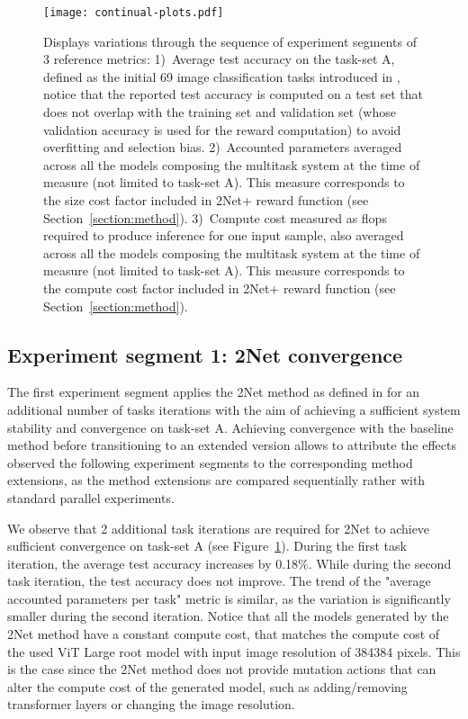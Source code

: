 \documentclass{article} \usepackage{iclr2023_conference,times}
\begin{document}
\begin{figure}[t]
  \centering
  \texttt{[image: continual-plots.pdf]}
  \caption{
  Displays variations through the sequence of experiment segments 
  of 3 reference metrics:
  1)~Average test accuracy on the task-set A, defined as the initial 69 image classification tasks introduced in \cite{Gesmundo2022munet2}, notice that the reported test accuracy is computed on a test set that does not overlap with the training set and validation set (whose validation accuracy is used for the reward computation) to avoid overfitting and selection bias.
  2)~Accounted parameters averaged across all the models composing the multitask system at the time of measure (not limited to task-set A). This measure corresponds to the size cost factor included in 2Net+ reward function (see Section~\ref{section:method}).
  3)~Compute cost measured as flops required to produce inference for one input sample, also averaged across all the models composing the multitask system at the time of measure (not limited to task-set A). This measure corresponds to the compute cost factor included in 2Net+ reward function (see Section~\ref{section:method}).
}
  \label{figure:continual}
\end{figure}


\subsection{Experiment segment 1: 2Net convergence}

The first experiment segment applies the 2Net method as defined in \citep{Gesmundo2022munet2} for an additional number of tasks iterations with the aim of achieving a sufficient system stability and convergence on task-set A.
Achieving convergence with the baseline method before transitioning to an extended version allows to attribute the effects observed the following experiment segments to the corresponding method extensions, as the method extensions are compared sequentially rather with standard parallel experiments.

We observe that 2 additional task iterations are required for 2Net to achieve sufficient convergence on task-set A (see Figure~\ref{figure:continual}).
During the first task iteration, the average test accuracy increases by 0.18\%.
While during the second task iteration, the test accuracy does not improve.
The trend of the "average accounted parameters per task" metric is similar, as the variation is significantly smaller during the second iteration.
Notice that all the models generated by the 2Net method have a constant compute cost, that matches the compute cost of the used ViT Large root model with input image resolution of 384384 pixels.
This is the case since the 2Net method does not provide mutation actions that can alter the compute cost of the generated model, such as adding/removing transformer layers or changing the image resolution. 
\end{document}
